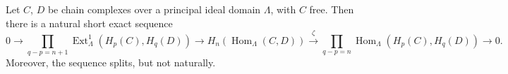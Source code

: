 Let $C$, $D$ be chain complexes over a principal ideal domain $\Lambda$, with $C$ free. Then there is a natural short exact sequence
$$0 \rightarrow \prod_{q-p=n+1} \operatorname{Ext}_\Lambda^1(H_p(C), H_q(D)) \rightarrow H_n(\operatorname{Hom}_\Lambda(C, D)) \xrightarrow{\zeta} \prod_{q-p=n} \operatorname{Hom}_\Lambda(H_p(C), H_q(D)) \rightarrow 0.$$
Moreover, the sequence splits, but not naturally.
